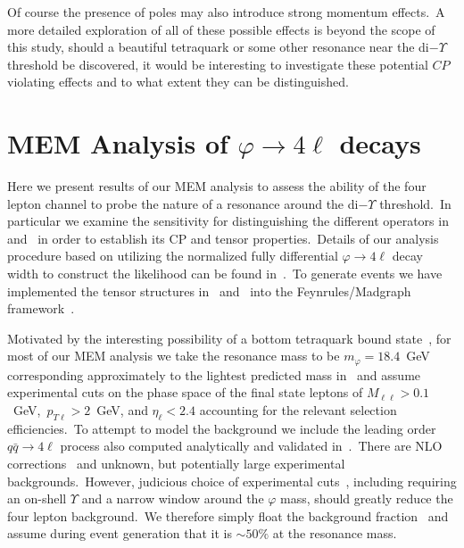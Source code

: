 \documentclass[nofootinbib,twocolumn,prl,preprintnumbers]{revtex4-1}
\begin{document}
Of course the presence of poles may also introduce strong momentum effects.~A more detailed exploration of all of these possible effects is beyond the scope of this study, should a beautiful tetraquark or some other resonance near the di$-\Upsilon$ threshold be discovered, it would be interesting to investigate these potential $CP$ violating effects and to what extent they can be distinguished.


\section{MEM Analysis of $\varphi \to 4\ell$ decays} \label{sec:LHC}

Here we present results of our MEM analysis to assess the ability of the four lepton channel to probe the nature of a resonance around the di$-\Upsilon$ threshold.~In particular we examine the sensitivity for distinguishing the different operators in~ and~ in order to establish its CP and tensor properties.~Details of our analysis procedure based on utilizing the normalized fully differential $\varphi \to 4\ell$ decay width to construct the likelihood can be found in~\cite{Stolarski:2012ps,Chen:2013ejz,Falkowski:2014ffa,Chen:2015rha,Chen:2016ofc}.~To generate events we have implemented the tensor structures in~ and~ into the Feynrules/Madgraph framework~\cite{Alwall:2014hca,Christensen:2008py}.

Motivated by the interesting possibility of a bottom tetraquark bound state~\cite{Berezhnoy:2011xn,Du:2012wp,Chen:2015moa,Karliner:2016zzc,Chen:2016jxd,Bai:2016int,Wu:2016vtq,Richard:2017vry,Wang:2017jtz}, for most of our MEM analysis we take the resonance mass to be $m_{\varphi} = 18.4$~GeV corresponding approximately to the lightest predicted mass in~\cite{Chen:2016jxd} and assume experimental cuts on the phase space of the final state leptons of $M_{\ell\ell} > 0.1$~GeV,~$p_{T\ell} > 2$~GeV, and $\eta_\ell < 2.4$ accounting for the relevant selection efficiencies.~To attempt to model the background we include the leading order $q\bar{q}\to 4\ell$ process also computed analytically and validated in~\cite{Chen:2012jy,Chen:2013ejz}.~There are NLO corrections~\cite{Frederix:2011ss,Biedermann:2016lvg} and unknown, but potentially large experimental backgrounds.~However, judicious choice of experimental cuts~\cite{Khachatryan:2016ydm}, including requiring an on-shell $\Upsilon$ and a narrow window around the $\varphi$ mass, should greatly reduce the four lepton background.~We therefore simply float the background fraction~\cite{Chen:2013ejz,Chen:2014pia} and assume during event generation that it is $\sim 50\%$ at the resonance mass.
\end{document}
